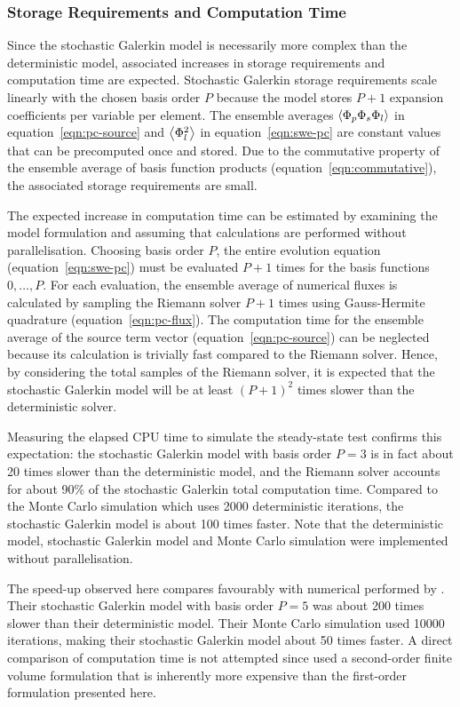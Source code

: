 \subsubsection{Storage Requirements and Computation Time}

Since the stochastic Galerkin model is necessarily more complex than the deterministic model, associated increases in storage requirements and computation time are expected.
Stochastic Galerkin storage requirements scale linearly with the chosen basis order $P$ because the model stores $P+1$ expansion coefficients per variable per element.
The ensemble averages $\left\langle \Phi_p \Phi_s \Phi_l \right\rangle$ in equation~\eqref{eqn:pc-source} and $\left\langle \Phi_l^2 \right\rangle$ in equation~\eqref{eqn:swe-pc} are constant values that can be precomputed once and stored.
Due to the commutative property of the ensemble average of basis function products (equation~\ref{eqn:commutative}), the associated storage requirements are small.

The expected increase in computation time can be estimated by examining the model formulation and assuming that calculations are performed without parallelisation.
Choosing basis order $P$, the entire evolution equation (equation~\ref{eqn:swe-pc}) must be evaluated $P+1$ times for the basis functions $0, \ldots, P$.
For each evaluation, the ensemble average of numerical fluxes is calculated by sampling the Riemann solver $P+1$ times using Gauss-Hermite quadrature (equation~\ref{eqn:pc-flux}).
The computation time for the ensemble average of the source term vector (equation~\ref{eqn:pc-source}) can be neglected because its calculation is trivially fast compared to the Riemann solver. 
Hence, by considering the total samples of the Riemann solver, it is expected that the stochastic Galerkin model will be at least $\left(P+1\right)^2$ times slower than the deterministic solver.

Measuring the elapsed CPU time to simulate the steady-state test confirms this expectation: the stochastic Galerkin model with basis order $P=3$ is in fact about 20 times slower than the deterministic model, and the Riemann solver accounts for about 90\% of the stochastic Galerkin total computation time.
Compared to the Monte Carlo simulation which uses \num{2000} deterministic iterations, the stochastic Galerkin model is about 100 times faster.
Note that the deterministic model, stochastic Galerkin model and Monte Carlo simulation were implemented without parallelisation.

The speed-up observed here compares favourably with numerical  performed by \citet{ge2008}.
Their stochastic Galerkin model with basis order $P=5$ was about 200 times slower than their deterministic model.
Their Monte Carlo simulation used \num{10000} iterations, making their stochastic Galerkin model about 50 times faster.
A direct comparison of computation time is not attempted since \citet{ge2008} used a second-order finite volume formulation that is inherently more expensive than the first-order formulation presented here.

